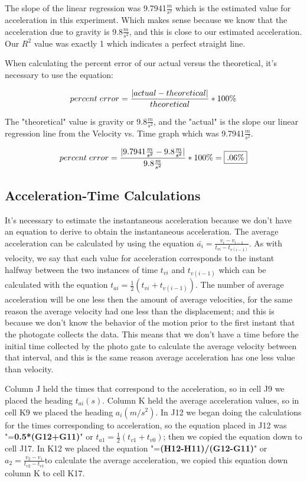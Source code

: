 \documentclass[aps,letterpaper,11pt]{revtex4}
\begin{document}
{The slope of the linear regression was 9.7941$\frac{m}{s^2}$ which is the estimated value for acceleration in this experiment. Which makes sense because we know that the acceleration due to gravity is 9.8$\frac{m}{s^2}$, and this is close to our estimated acceleration. Our $R^2$ value was exactly 1 which indicates a perfect straight line.

When calculating the percent error of our actual versus the theoretical, it's necessary to use the equation:

$$percent\hspace{1mm}error = \frac{|actual - theoretical|}{theoretical}*100\%$$

The "theoretical" value is gravity or 9.8$\frac{m}{s^2}$, and the "actual" is the slope our linear regression line from the Velocity vs. Time graph which was 9.7941$\frac{m}{s^2}$.

$$percent\hspace{1mm}error = \frac{|9.7941\frac{m}{s^2} - 9.8\frac{m}{s^2}|}{9.8\frac{m}{s^2}}*100\% = \boxed{.06\%}$$

\subsection{Acceleration-Time Calculations} 

It's necessary to estimate the instantaneous acceleration because we don't have an equation to derive to obtain the instantaneous acceleration. The average acceleration can be calculated by using the equation $\bar{a_i}=\frac{v_i-v_{i-1}}{t_{vi}-t_{v(i-1)}}$. As with velocity, we say that each value for acceleration corresponds to the instant halfway between the two instances of time $t_{vi}$ and $t_{v(i-1)}$ which can be calculated with the equation $t_{ai}=\frac{1}{2}(t_{vi}+t_{v(i-1)})$. The number of average acceleration will be one less then the amount of average velocities, for the same reason the average velocity had one less than the displacement; and this is because we don't know the behavior of the motion prior to the first instant that the photogate collects the data. This means that we don't have a time before the initial time collected by the photo gate to calculate the average velocity between that interval, and this is the same reason average acceleration has one less value than velocity. 

Column J held the times that correspond to the acceleration, so in cell J9 we placed the heading $t_{ai} (s)$. Column K held the average acceleration values, so in cell K9 we placed the heading $a_i (m/s^2)$. In J12 we began doing the calculations for the times corresponding to acceleration, so the equation placed in J12 was "=\textbf{0.5*(G12+G11)}" or $t_{a1}=\frac{1}{2}(t_{v1}+t_{v0})$; then we copied the equation down to cell J17. In K12 we placed the equation "=\textbf{(H12-H11)/(G12-G11)}" or $a_2=\frac{v_2-v_1}{t_{v2}-t_{v1}}$to calculate the average acceleration, we copied this equation down column K to cell K17. 

}
\end{document}
